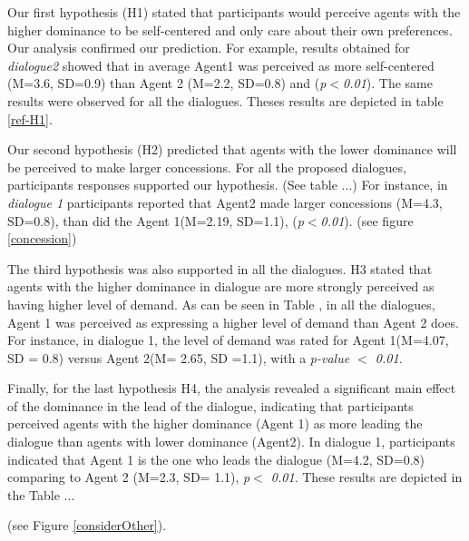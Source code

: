 \documentclass{llncs}
\begin{document}
				\par Our first hypothesis (H1) stated that participants would perceive agents with the higher dominance to be self-centered and only care about their own preferences. Our analysis confirmed our prediction. For example, results obtained for \textit{dialogue2} showed that in average Agent1 was perceived as more self-centered (M=3.6, SD=0.9) than Agent 2 (M=2.2, SD=0.8) and (\textit{p$<$0.01}). The same results were observed for all the dialogues. Theses results are depicted in table \ref{ref-H1}.
				
				\par Our second hypothesis (H2) predicted that agents with the lower dominance will be perceived to make larger concessions. For all the proposed dialogues, participants responses supported our hypothesis. (See table ...)
				For instance, in \textit{dialogue 1} participants reported that Agent2 made larger concessions (M=4.3, SD=0.8), than did the Agent 1(M=2.19, SD=1.1), (\textit{p$<$0.01}).  (see figure  \ref{concession})
				
				\par The third hypothesis was also supported in all the dialogues. H3 stated that agents with the higher dominance in dialogue are more strongly perceived as having higher level of demand. As can be seen in Table , in all the dialogues, Agent 1 was perceived as expressing a higher level of demand than Agent 2 does. For instance, in dialogue 1, the level of demand was rated for Agent 1(M=4.07, SD = 0.8) versus Agent 2(M= 2.65, SD =1.1), with a \textit{p-value $<$ 0.01}.
				
				\par Finally, for the last hypothesis H4, the analysis revealed a significant main effect of the dominance in the lead of the dialogue, indicating that participants perceived agents with the higher dominance (Agent 1) as more leading the dialogue than agents with lower dominance (Agent2). In dialogue 1, participants indicated that Agent 1 is the one who leads the dialogue (M=4.2, SD=0.8) comparing to Agent 2 (M=2.3, SD= 1.1), \textit{p$<$ 0.01}. These results are depicted in the Table ... 
				
				
				 (see Figure \ref{considerOther}).
							
\end{document}
